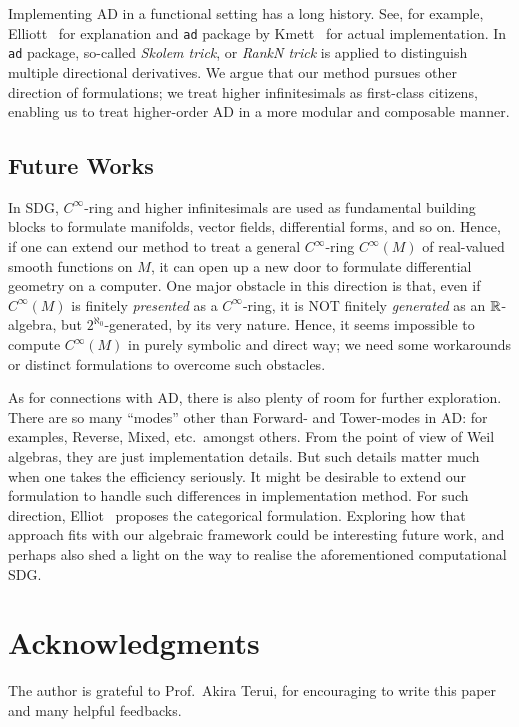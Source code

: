 \documentclass[runningheads]{llncs}
\begin{document}
Implementing AD in a functional setting has a long history.
See, for example, Elliott~\cite{Elliott2009-beautiful-differentiation} for explanation and \texttt{ad} package by Kmett~\cite{Kmett:2010aa} for actual implementation.
In \texttt{ad} package, so-called \emph{Skolem trick}, or \emph{RankN trick} is applied to distinguish multiple directional derivatives.
We argue that our method pursues other direction of formulations; we treat higher infinitesimals as first-class citizens, enabling us to treat higher-order AD in a more modular and composable manner.

\subsection{Future Works}
In SDG, $C^\infty$-ring and higher infinitesimals are used as fundamental building blocks to formulate manifolds, vector fields, differential forms, and so on.
Hence, if one can extend our method to treat a general $C^\infty$-ring $C^\infty(M)$ of real-valued smooth functions on $M$, it can open up a new door to formulate differential geometry on a computer.
One major obstacle in this direction is that, even if $C^\infty(M)$ is finitely \emph{presented} as a $C^\infty$-ring, it is NOT finitely \emph{generated} as an $\mathbb{R}$-algebra, but $2^{\aleph_0}$-generated, by its very nature.
Hence, it seems impossible to compute $C^\infty(M)$ in purely symbolic and direct way; we need some workarounds or distinct formulations to overcome such obstacles.

As for connections with AD, there is also plenty of room for further exploration.
There are so many ``modes'' other than Forward- and Tower-modes in AD: for examples, Reverse, Mixed, etc.\ amongst others.
From the point of view of Weil algebras, they are just implementation details.
But such details matter much when one takes the efficiency seriously.
It might be desirable to extend our formulation to handle such differences in implementation method.
For such direction, Elliot~\cite{Elliott:2018aa} proposes the categorical formulation.
Exploring how that approach fits with our algebraic framework could be interesting future work, and perhaps also shed a light on the way to realise the aforementioned computational SDG.

\section*{Acknowledgments}
The author is grateful to Prof.\ Akira Terui, for encouraging to write this paper and many helpful feedbacks.
\appendix
\end{document}
